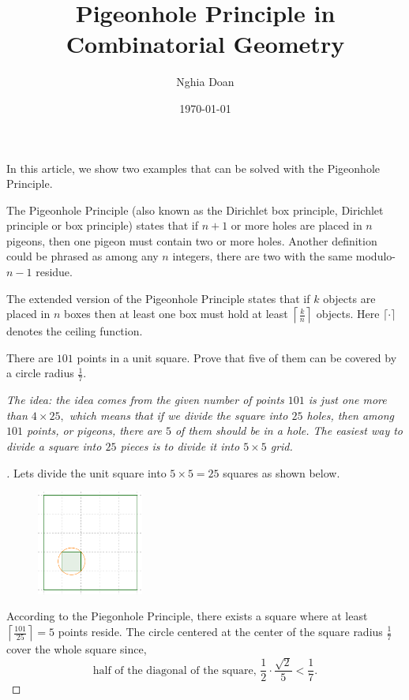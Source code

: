 \documentclass{article}
\title{Pigeonhole Principle in Combinatorial Geometry}
\author{Nghia Doan}
\date{\today}
\begin{document}
\maketitle

In this article, we show two examples that can be solved with the Pigeonhole Principle.

\begin{definition*}
    \label{definition:pigeonhole-principle}
    The Pigeonhole Principle (also known as the Dirichlet box principle, Dirichlet principle or box principle)
    states that if $n + 1$ or more holes are placed in $n$ pigeons, then one pigeon must contain two or more holes.
    Another definition could be phrased as among any $n$ integers, there are two with the same modulo-$n-1$ residue.

    The extended version of the Pigeonhole Principle states that if $k$ objects are placed in $n$ boxes
    then at least one box must hold at least $\left\lceil \frac{k}{n} \right\rceil$ objects.
    Here $\lceil \cdot \rceil$ denotes the ceiling function.
\end{definition*}

\begin{example*}[One]
    \label{example:one}
    There are $101$ points in a unit square.
    Prove that five of them can be covered by a circle radius $\frac{1}{7}.$ 
\end{example*}

\begin{remark*}
    \textit{The idea: the idea comes from the given number of points $101$ is just one more than $4 \times 25,$
    which means that if we divide the square into $25$ \textit{holes},
    then among $101$ points, or \textit{pigeons}, there are $5$ of them should be in a \textit{hole.}
    The easiest way to divide a square into $25$ pieces is to divide it into $5 \times 5$ grid.}
\end{remark*}

\begin{proof}[]
    Lets divide the unit square into $5 \times 5 = 25$ squares as shown below.
    \begin{figure}[h]
        \centering
        \includegraphics[width=3.5cm]{./svg/pdf/2022-2-ms-1-2.pdf}
    \end{figure}

    According to the Piegonhole Principle,
    there exists a square where at least $\left \lceil \frac{101}{25} \right \rceil = 5$ points reside.
    The circle centered at the center of the square radius $\frac{1}{7}$ cover the whole square since,
    \[ 
        \text{half of the diagonal of the square,\ }\frac{1}{2} \cdot \frac{\sqrt{2}}{5}  < \boxed{\frac{1}{7}.}
    \]
\end{proof}
\end{document}
